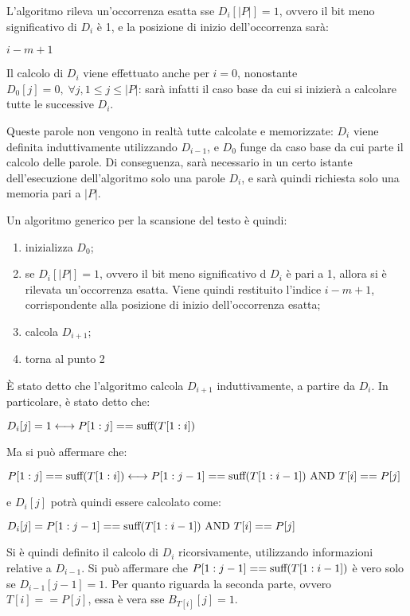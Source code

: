 L'algoritmo rileva un'occorrenza esatta sse $D_i[|P|] = 1$, ovvero il bit meno significativo di $D_i$ è 1, e la posizione di inizio dell'occorrenza sarà:
\begin{center}
    $i-m+1$
\end{center}
Il calcolo di $D_i$ viene effettuato anche per $i=0$, nonostante $D_0[j] = 0, \; \forall j, 1 \le j \le |P|$: sarà infatti il caso base da cui si inizierà a calcolare tutte le successive $D_i.$

Queste parole non vengono in realtà tutte calcolate e memorizzate: $D_i$ viene definita induttivamente utilizzando $D_{i-1}$, e $D_0$ funge da caso base da cui parte il calcolo delle parole. Di conseguenza, sarà necessario in un certo istante dell'esecuzione dell'algoritmo solo una parole $D_i$, e sarà quindi richiesta solo una memoria pari a $|P|$.

Un algoritmo generico per la scansione del testo è quindi:
\begin{enumerate}
    \item inizializza $D_0$;
    \item se $D_i[|P|] = 1$, ovvero il bit meno significativo d $D_i$ è pari a 1, allora si è rilevata un'occorrenza esatta. Viene quindi restituito l'indice $i-m+1$, corrispondente alla posizione di inizio dell'occorrenza esatta;
    \item calcola $D_{i+1}$;
    \item torna al punto 2
\end{enumerate}

È stato detto che l'algoritmo calcola $D_{i+1}$ induttivamente, a partire da $D_i$. In particolare, è stato detto che:
\begin{center}
    $D_i[j] = 1 \longleftrightarrow P[1:j] == \textnormal{suff}(T[1:i])$
\end{center}
Ma si può affermare che:
\begin{center}
    $P[1:j] == \textnormal{suff}(T[1:i]) \longleftrightarrow P[1:j-1] == \textnormal{suff}(T[1:i-1]) \textnormal{ AND } T[i] == P[j]$
\end{center}
e $D_i[j]$ potrà quindi essere calcolato come:
\begin{center}
    $D_i[j] = P[1:j-1] == \textnormal{suff}(T[1:i-1]) \textnormal{ AND } T[i] == P[j]$
\end{center}
Si è quindi definito il calcolo di $D_i$ ricorsivamente, utilizzando informazioni relative a $D_{i-1}$. Si può affermare che $P[1:j-1] == \textnormal{suff}(T[1:i-1])$ è vero solo se $D_{i-1}[j-1] = 1$.
Per quanto riguarda la seconda parte, ovvero $T[i] == P[j]$, essa è vera sse $B_{T[i]}[j] = 1$.

